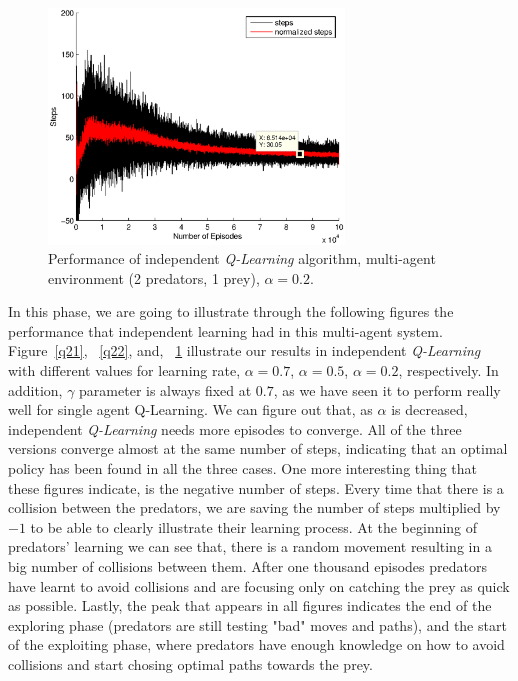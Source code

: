 \documentclass[a4paper,11pt]{article}
\begin{document}
\begin{figure}[ht!]
  \centering
	\includegraphics[width=0.7\textwidth]{figures/q202.eps}
    \caption{Performance of independent \textit{Q-Learning} algorithm, multi-agent environment (2 predators, 1 prey), $\alpha = 0.2$.}
    \label{q23}
\end{figure}

In this phase, we are going to illustrate through the following figures the performance that independent learning had in this multi-agent system. 
Figure~\ref{q21}, ~\ref{q22}, and, ~\ref{q23} illustrate our results in independent \textit{Q-Learning} with different values for learning rate, $\alpha = 0.7$, $\alpha = 0.5$, $\alpha = 0.2$, respectively. In addition, $\gamma$ parameter is always fixed at $0.7$, as we have seen it to perform really well for single agent {Q-Learning}. We can figure out that, as $\alpha$ is decreased, independent \textit{Q-Learning} needs more episodes to converge. All of the three versions converge almost at the same number of steps, indicating that an optimal policy has been found in all the three cases.   
One more interesting thing that these figures indicate, is the negative number of steps. Every time that there is a collision between the predators, we are saving the number of steps multiplied by $-1$ to be able to clearly illustrate their learning process. At the beginning of predators' learning we can see that, there is a random movement resulting in a big number of collisions between them. After one thousand episodes predators have learnt to avoid collisions and are focusing only on catching the prey as quick as possible. Lastly, the peak that appears in all figures indicates the end of the exploring phase (predators are still testing "bad" moves and paths), and the start of the exploiting phase, where predators have enough knowledge on how to avoid collisions and start chosing optimal paths towards the prey.
\end{document}
